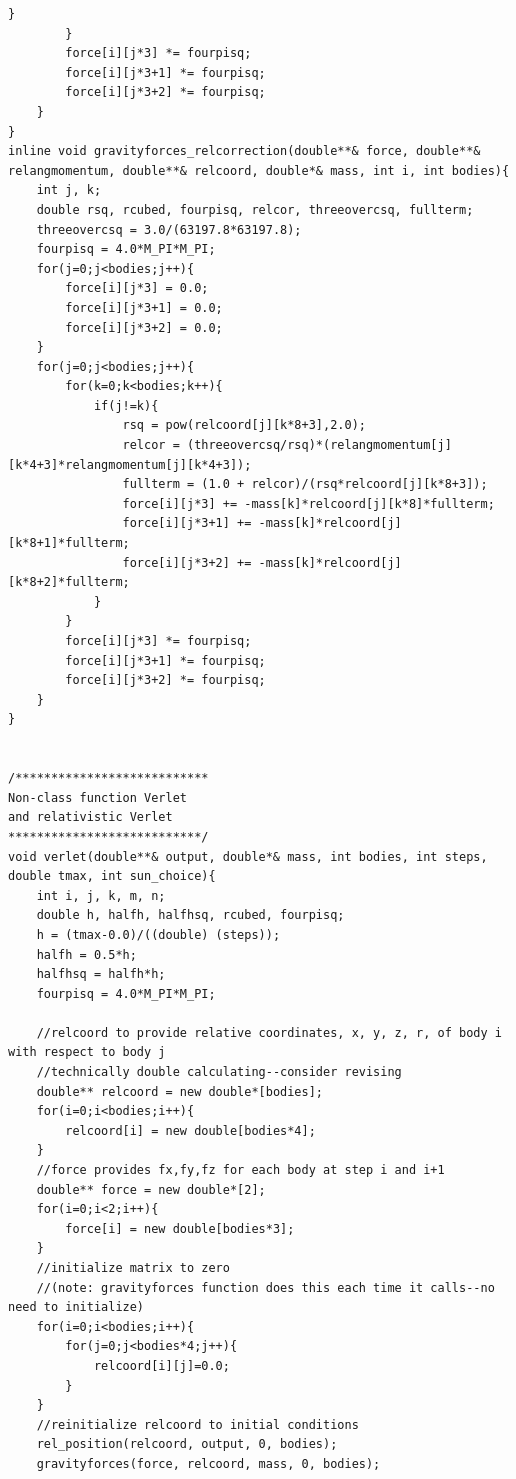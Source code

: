 \documentclass[11pt,a4paper]{article}
\begin{document}
\begin{lstlisting}[title={project3-library.h}]
			}
		}
		force[i][j*3] *= fourpisq;
		force[i][j*3+1] *= fourpisq;
		force[i][j*3+2] *= fourpisq;
	}
}
inline void gravityforces_relcorrection(double**& force, double**& relangmomentum, double**& relcoord, double*& mass, int i, int bodies){
	int j, k;
	double rsq, rcubed, fourpisq, relcor, threeovercsq, fullterm;
	threeovercsq = 3.0/(63197.8*63197.8);
	fourpisq = 4.0*M_PI*M_PI;
	for(j=0;j<bodies;j++){
		force[i][j*3] = 0.0;
		force[i][j*3+1] = 0.0;
		force[i][j*3+2] = 0.0;
	}
	for(j=0;j<bodies;j++){
		for(k=0;k<bodies;k++){
			if(j!=k){
				rsq = pow(relcoord[j][k*8+3],2.0);
				relcor = (threeovercsq/rsq)*(relangmomentum[j][k*4+3]*relangmomentum[j][k*4+3]);
				fullterm = (1.0 + relcor)/(rsq*relcoord[j][k*8+3]);
				force[i][j*3] += -mass[k]*relcoord[j][k*8]*fullterm;
				force[i][j*3+1] += -mass[k]*relcoord[j][k*8+1]*fullterm;
				force[i][j*3+2] += -mass[k]*relcoord[j][k*8+2]*fullterm;
			}
		}
		force[i][j*3] *= fourpisq;
		force[i][j*3+1] *= fourpisq;
		force[i][j*3+2] *= fourpisq;
	}
}


/***************************
Non-class function Verlet
and relativistic Verlet
***************************/
void verlet(double**& output, double*& mass, int bodies, int steps, double tmax, int sun_choice){
	int i, j, k, m, n;
	double h, halfh, halfhsq, rcubed, fourpisq;
	h = (tmax-0.0)/((double) (steps));
	halfh = 0.5*h;
	halfhsq = halfh*h;	
	fourpisq = 4.0*M_PI*M_PI;

	//relcoord to provide relative coordinates, x, y, z, r, of body i with respect to body j
	//technically double calculating--consider revising
	double** relcoord = new double*[bodies];
	for(i=0;i<bodies;i++){
		relcoord[i] = new double[bodies*4];
	}
	//force provides fx,fy,fz for each body at step i and i+1
	double** force = new double*[2];
	for(i=0;i<2;i++){
		force[i] = new double[bodies*3];
	}
	//initialize matrix to zero
	//(note: gravityforces function does this each time it calls--no need to initialize)
	for(i=0;i<bodies;i++){
		for(j=0;j<bodies*4;j++){
			relcoord[i][j]=0.0;
		}
	}
	//reinitialize relcoord to initial conditions
	rel_position(relcoord, output, 0, bodies);
	gravityforces(force, relcoord, mass, 0, bodies);


\end{lstlisting}
\end{document}

